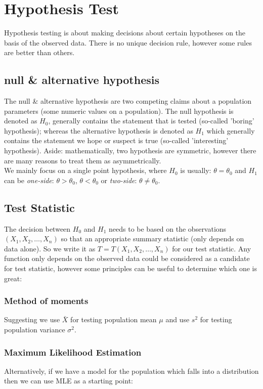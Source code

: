 \documentclass[12pt ]{article}
\begin{document}
\section{Hypothesis Test}
Hypothesis testing is about making decisions about certain hypotheses on the basis of the observed data. There is no unique decision rule, however some rules are better than others.
\subsection{null \& alternative hypothesis}
The null \& alternative hypothesis are two competing claims about a population parameters (some numeric values on a population). The null hypothesis is denoted as $H_{0}$, generally contains the statement that is tested (so-called 'boring' hypothesis); whereas the alternative hypothesis is denoted as $H_{1}$ which generally contains the statement we hope or suspect is true (so-called 'interesting' hypothesis). \color{brown} Aside: mathematically, two hypothesis are symmetric, however there are many reasons to treat them as asymmetrically. \\

\color{black}
We mainly focus on a single point hypothesis, where $H_{0}$ is usually: $\theta = \theta_{0}$ and $H_{1}$ can be \textit{one-side}: $\theta > \theta_{0}$, $\theta < \theta_{0}$ or \textit{two-side}: $\theta \neq \theta_{0}$.
\subsection{Test Statistic}
The decision between $H_{0}$ and $H_{1}$ needs to be based on the observations $(X_{1}, X_{2}, \ldots, X_{n})$ so that an appropriate summary statistic (only depends on data alone). So we write it as $T = T(X_{1}, X_{2}, \ldots, X_{n})$ for our test statistic. Any function only depends on the observed data could be considered as a candidate for test statistic, however some principles can be useful to determine which one is great:
\subsubsection{Method of moments}
Suggesting we use $\bar{X}$ for testing population mean $\mu$ and use $s^2$ for testing population variance $\sigma^2$.
\subsubsection{Maximum Likelihood Estimation}
Alternatively, if we have a model for the population which falls into a distribution then we can use MLE as a starting point: \\
\end{document}
